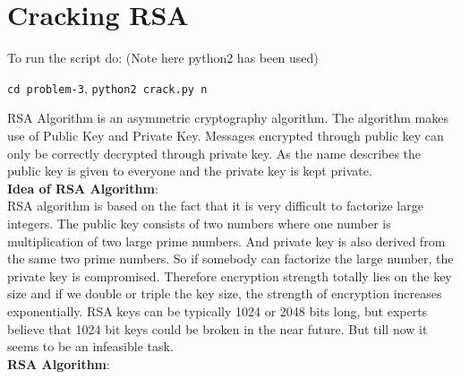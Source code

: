 \documentclass{exam}
\begin{document}
\section{Cracking RSA}
To run the script do: (Note here python2 has been used)
\begin{center}
    \texttt{cd problem-3},
    \texttt{python2 crack.py n}
\end{center}
RSA Algorithm is an asymmetric cryptography algorithm. The algorithm makes use of Public Key and Private Key. Messages encrypted through public key can only be correctly decrypted through private key. As the name describes the public key is given to everyone and the private key is kept private. \vspace{0.05in} \\
\textbf{Idea of RSA Algorithm}: \vspace{0.05in} \\
RSA algorithm is based on the fact that it is very difficult to factorize large integers. The public key consists of two numbers where one number is multiplication of two large prime numbers. And private key is also derived from the same two prime numbers. So if somebody can factorize the large number, the private key is compromised. Therefore encryption strength totally lies on the key size and if we double or triple the key size, the strength of encryption increases exponentially. RSA keys can be typically 1024 or 2048 bits long, but experts believe that 1024 bit keys could be broken in the near future. But till now it seems to be an infeasible task. \vspace{0.05in} \\
\textbf{RSA Algorithm}:
\end{document}
